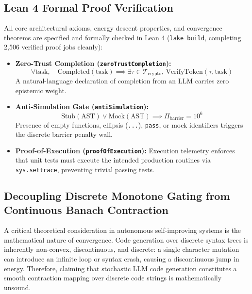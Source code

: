 \documentclass[10pt,journal,compsoc]{IEEEtran}
\theoremstyle{definition}
\begin{document}
\subsection{Lean 4 Formal Proof Verification}
All core architectural axioms, energy descent properties, and convergence theorems are specified and formally checked in Lean 4 (\texttt{lake build}, completing 2,506 verified proof jobs cleanly):
\begin{itemize}
    \item \textbf{Zero-Trust Completion (\texttt{zeroTrustCompletion}):}
    \begin{equation}
    \forall \text{task}, \quad \text{Completed}(\text{task}) \implies \exists \tau \in \mathcal{T}_{\text{crypto}}, \, \text{VerifyToken}(\tau, \text{task})
    \end{equation}
    A natural-language declaration of completion from an LLM carries zero epistemic weight.
    \item \textbf{Anti-Simulation Gate (\texttt{antiSimulation}):}
    \begin{equation}
    \text{Stub}(\text{AST}) \lor \text{Mock}(\text{AST}) \implies \Pi_{\text{barrier}} = 10^6
    \end{equation}
    Presence of empty functions, ellipsis (\texttt{...}), \texttt{pass}, or mock identifiers triggers the discrete barrier penalty wall.
    \item \textbf{Proof-of-Execution (\texttt{proofOfExecution}):}
    Execution telemetry enforces that unit tests must execute the intended production routines via \texttt{sys.settrace}, preventing trivial passing tests.
\end{itemize}

\subsection{Decoupling Discrete Monotone Gating from Continuous Banach Contraction}
A critical theoretical consideration in autonomous self-improving systems is the mathematical nature of convergence. Code generation over discrete syntax trees is inherently non-convex, discontinuous, and discrete: a single character mutation can introduce an infinite loop or syntax crash, causing a discontinuous jump in energy. Therefore, claiming that stochastic LLM code generation constitutes a smooth contraction mapping over discrete code strings is mathematically unsound.
\end{document}

